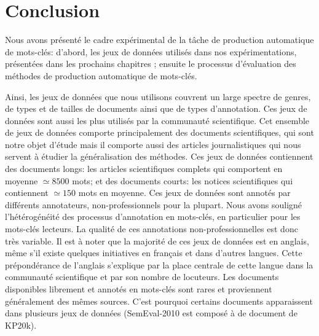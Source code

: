 \section{Conclusion}

Nous avons présenté le cadre expérimental de la tâche de production automatique de mots-clés: d'abord, les jeux de données utilisés dans nos expérimentations, présentées dans les prochains chapitres ; ensuite le processus d'évaluation des méthodes de production automatique de mots-clés.

Ainsi, les jeux de données que nous utilisons couvrent un large spectre de genres, de types et de tailles de documents ainsi que de types d'annotation.
Ces jeux de données sont aussi les plus utilisés par la communauté scientifique.
Cet ensemble de jeux de données comporte principalement des documents scientifiques, qui sont notre objet d'étude mais il comporte aussi des articles journalistiques qui nous servent à étudier la généralisation des méthodes.
%
Ces jeux de données contiennent des documents longs: les articles scientifiques complets qui comportent en moyenne $\simeq 8500$ mots; et des documents courts: les notices scientifiques qui contiennent $\simeq 150$ mots en moyenne.
Ces jeux de données sont annotés par différents annotateurs, non-professionnels pour la plupart.
Nous avons souligné l'hétérogénéité des processus d'annotation en mots-clés, en particulier pour les mots-clés lecteurs.
La qualité de ces annotations non-professionnelles est donc très variable.
Il est à noter que la majorité de ces jeux de données est en anglais, même s'il existe quelques initiatives en français et dans d'autres langues.
Cette prépondérance de l'anglais s'explique par la place centrale de cette langue dans la communauté scientifique et par son nombre de locuteurs.
Les documents disponibles librement et annotés en mots-clés sont rares et proviennent généralement des mêmes sources.
C'est pourquoi certains documents apparaissent dans plusieurs jeux de données (SemEval-2010 est composé à  de document de KP20k).

